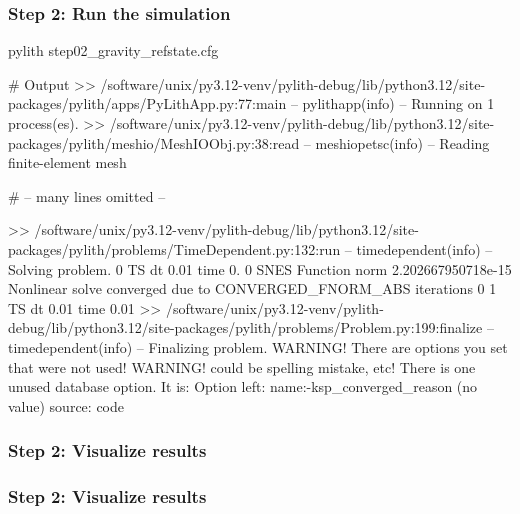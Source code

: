 \documentclass[aspectratio=169]{beamer}
\begin{document}
\begin{frame}[fragile]
  \frametitle{Step 2: Run the simulation}
  \summary{}

\begin{bashcode}
pylith step02_gravity_refstate.cfg

# Output
 >> /software/unix/py3.12-venv/pylith-debug/lib/python3.12/site-packages/pylith/apps/PyLithApp.py:77:main
 -- pylithapp(info)
 -- Running on 1 process(es).
 >> /software/unix/py3.12-venv/pylith-debug/lib/python3.12/site-packages/pylith/meshio/MeshIOObj.py:38:read
 -- meshiopetsc(info)
 -- Reading finite-element mesh

# -- many lines omitted --

 >> /software/unix/py3.12-venv/pylith-debug/lib/python3.12/site-packages/pylith/problems/TimeDependent.py:132:run
 -- timedependent(info)
 -- Solving problem.
0 TS dt 0.01 time 0.
    0 SNES Function norm 2.202667950718e-15
    Nonlinear solve converged due to CONVERGED_FNORM_ABS iterations 0
1 TS dt 0.01 time 0.01
 >> /software/unix/py3.12-venv/pylith-debug/lib/python3.12/site-packages/pylith/problems/Problem.py:199:finalize
 -- timedependent(info)
 -- Finalizing problem.
WARNING! There are options you set that were not used!
WARNING! could be spelling mistake, etc!
There is one unused database option. It is:
Option left: name:-ksp_converged_reason (no value) source: code
\end{bashcode}
  
\end{frame}


\begin{frame}
  \frametitle{Step 2: Visualize results}

    
\end{frame}


\begin{frame}
  \frametitle{Step 2: Visualize results}

    
\end{frame}
\end{document}
